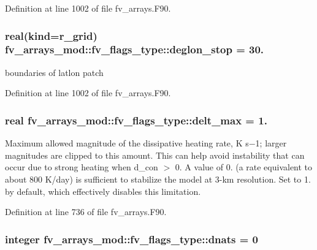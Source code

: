 Definition at line 1002 of file fv\-\_\-arrays.\-F90.

\subsubsection[{deglon\-\_\-stop}]{\setlength{\rightskip}{0pt plus 5cm}real(kind={\bf r\-\_\-grid}) fv\-\_\-arrays\-\_\-mod\-::fv\-\_\-flags\-\_\-type\-::deglon\-\_\-stop = 30.}\label{structfv__arrays__mod_1_1fv__flags__type_a0a52ce1af7414411437fd97e3fbad4d9}


boundaries of latlon patch 



Definition at line 1002 of file fv\-\_\-arrays.\-F90.

\subsubsection[{delt\-\_\-max}]{\setlength{\rightskip}{0pt plus 5cm}real fv\-\_\-arrays\-\_\-mod\-::fv\-\_\-flags\-\_\-type\-::delt\-\_\-max = 1.}\label{structfv__arrays__mod_1_1fv__flags__type_a33f224dad417bcc25d11e2fdce4f2a53}


Maximum allowed magnitude of the dissipative heating rate, K s−1; larger magnitudes are clipped to this amount. This can help avoid instability that can occur due to strong heating when d\-\_\-con $>$ 0. A value of 0. (a rate equivalent to about 800 K/day) is sufficient to stabilize the model at 3-\/km resolution. Set to 1. by default, which effectively disables this limitation. 



Definition at line 736 of file fv\-\_\-arrays.\-F90.

\subsubsection[{dnats}]{\setlength{\rightskip}{0pt plus 5cm}integer fv\-\_\-arrays\-\_\-mod\-::fv\-\_\-flags\-\_\-type\-::dnats = 0}\label{structfv__arrays__mod_1_1fv__flags__type_a3c8880ee23bd497bb848ee8627a986cd}



